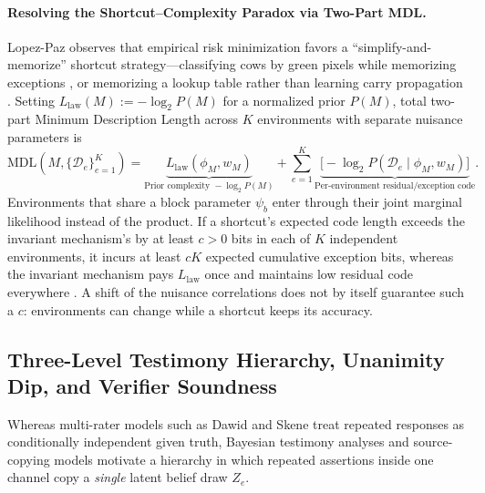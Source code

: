 \documentclass[11pt,a4paper]{article}
\theoremstyle{definition}
\theoremstyle{remark}
\begin{document}
\paragraph{Resolving the Shortcut--Complexity Paradox via Two-Part MDL.}
Lopez-Paz \cite{lopezpaz2026against} observes that empirical risk minimization favors a ``simplify-and-memorize'' shortcut strategy---classifying cows by green pixels while memorizing exceptions \cite{beery2018recognition}, or memorizing a lookup table rather than learning carry propagation \cite{ahuja2024provable,lopezpaz2026against}. Setting $L_{\mathrm{law}}(M) := -\log_2 P(M)$ for a normalized prior $P(M)$, total two-part Minimum Description Length across $K$ environments with separate nuisance parameters is
\begin{equation}
  \mathrm{MDL}(M, \{\mathcal{D}_e\}_{e=1}^K)
  = \underbrace{L_{\mathrm{law}}(\phi_M, w_M)}_{\text{Prior complexity } -\log_2 P(M)}
  + \sum_{e=1}^K \underbrace{\bigl[-\log_2 P(\mathcal{D}_e \mid \phi_M, w_M)\bigr]}_{\text{Per-environment residual/exception code}}.
  \label{eq:mdl}
\end{equation}
Environments that share a block parameter $\psi_b$ enter through their joint marginal likelihood instead of the product. If a shortcut's expected code length exceeds the invariant mechanism's by at least $c > 0$ bits in each of $K$ independent environments, it incurs at least $cK$ expected cumulative exception bits, whereas the invariant mechanism pays $L_{\mathrm{law}}$ once and maintains low residual code everywhere \cite{nozick2001invariances}. A shift of the nuisance correlations does not by itself guarantee such a $c$: environments can change while a shortcut keeps its accuracy.

\subsection{Three-Level Testimony Hierarchy, Unanimity Dip, and Verifier Soundness}

Whereas multi-rater models such as Dawid and Skene \cite{dawid1979maximum} treat repeated responses as conditionally independent given truth, Bayesian testimony analyses \cite{bovens2003bayesian,olsson2005against} and source-copying models \cite{dong2009integrating} motivate a hierarchy in which repeated assertions inside one channel copy a \emph{single} latent belief draw $Z_e$.
\end{document}
